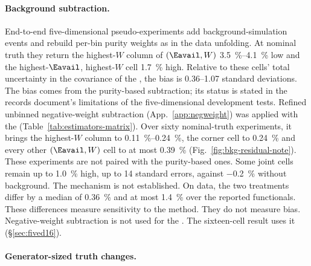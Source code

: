 \paragraph{Background subtraction.}

End-to-end five-dimensional pseudo-experiments add background-simulation events and rebuild per-bin purity weights as in the data unfolding. At nominal truth they return the highest-$W$ column of $(\Eavail,W)$ \SIrange{3.5}{4.1}{\percent} low and the highest-$\Eavail$, highest-$W$ cell \SI{1.7}{\percent} high. Relative to these cells' total uncertainty in the covariance of the \resFiveAxis{}, the bias is 0.36--1.07 standard deviations. The bias comes from the purity-based subtraction; its status is stated in the records document's limitations of the five-dimensional development tests. Refined unbinned negative-weight subtraction (App.~\ref{app:negweight}) was applied with the \estLowCap{} (Table~\ref{tab:estimators-matrix}). Over sixty nominal-truth experiments, it brings the highest-$W$ column to \SIrange{0.11}{0.24}{\percent}, the corner cell to \SI{0.24}{\percent} and every other $(\Eavail,W)$ cell to at most \SI{0.39}{\percent} (Fig.~\ref{fig:bkg-residual-note}). These experiments are not paired with the purity-based ones. Some joint cells remain up to \SI{1.0}{\percent} high, up to 14 standard errors, against \SI{-0.2}{\percent} without background. The mechanism is not established. On data, the two treatments differ by a median of \SI{0.36}{\percent} and at most \SI{1.4}{\percent} over the reported functionals. These differences measure sensitivity to the method. They do not measure bias. Negative-weight subtraction is not used for the \resFiveAxis{}. The sixteen-cell result uses it (\S\ref{sec:fived16}).

\paragraph{Generator-sized truth changes.}

